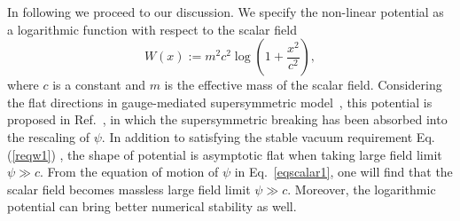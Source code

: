 \documentclass[pr, twocolumn, preprintnumbers, showpacs,footnoteadded, superscriptaddress,nofootinbib,longbibliography]{revtex4-1}
\begin{document}
In following we proceed to our discussion. We specify the non-linear potential as a logarithmic function with respect to the scalar field
%
\begin{equation} \label{potential}
W(x):=m^2 c^2 \log(1+\frac{x^2}{c^2}),
\end{equation}
%
where $c$ is a constant and $m$ is the effective mass of the scalar field. Considering the flat directions in gauge-mediated supersymmetric model~\cite{deGouvea:1997afu, Kusenko:1997si}, this potential is proposed in Ref.~\cite{Hong:2019mcj}, in which the supersymmetric breaking has been absorbed into the rescaling of $\psi$. In addition to satisfying the stable vacuum requirement Eq.(\ref{reqw1}) , the shape of potential is asymptotic flat when taking large field limit $\psi \gg c$. From the equation of motion of $\psi$ in Eq.~\eqref{eqscalar1}, one will find that the scalar field becomes massless large field limit $\psi \gg c$. Moreover, the logarithmic potential can bring better numerical stability as well.
\end{document}
